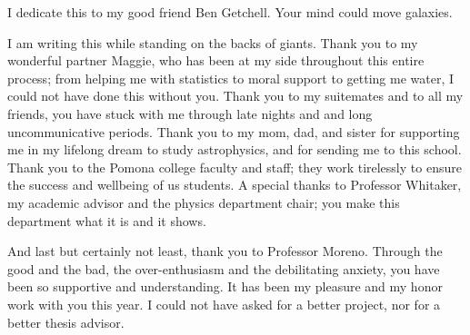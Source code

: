 
I dedicate this to my good friend Ben Getchell. Your mind could move galaxies.

I am writing this while standing on the backs of giants. Thank you to my wonderful partner Maggie, who has been at my side throughout this entire process; from helping me with statistics to moral support to getting me water, I could not have done this without you. Thank you to my suitemates and to all my friends, you have stuck with me through late nights and and long uncommunicative periods. Thank you to my mom, dad, and sister for supporting me in my lifelong dream to study astrophysics, and for sending me to this school. Thank you to the Pomona college faculty and staff; they work tirelessly to ensure the success and wellbeing of us students. A special thanks to Professor Whitaker, my academic advisor and the physics department chair; you make this department what it is and it shows.

And last but certainly not least, thank you to Professor Moreno. Through the good and the bad, the over-enthusiasm and the debilitating anxiety, you have been so supportive and understanding. It has been my pleasure and my honor work with you this year. I could not have asked for a better project, nor for a better thesis advisor.